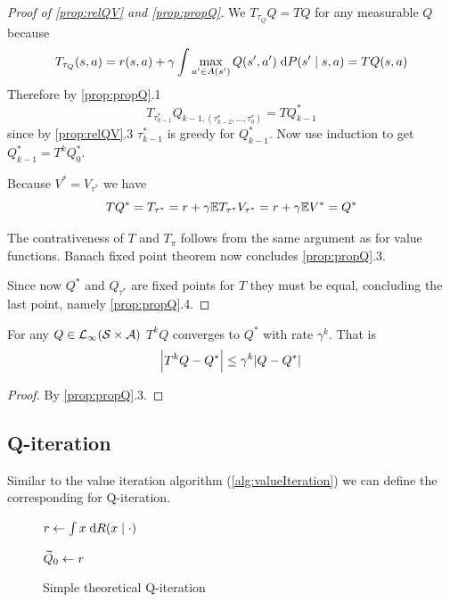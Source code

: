 \begin{proof}[Proof of \cref{prop:relQV} and \cref{prop:propQ}]
    We $T_{\tau_Q} Q = T Q$ for any measurable $Q$ because
  \[ T_{\tau_Q}(s, a) = r(s, a) + \gamma \int \max_{a' \in A(s')} Q(s', a')
  \; \mathrm{d} P(s' \mid s, a) = TQ(s, a) \]
  Therefore by \cref{prop:propQ}.1
  \[ T_{\tau_{k-1}^*} Q_{k-1, (\tau_{k-2}^*, \dots, \tau_0^*)}
  = T Q_{k-1}^* \]
  since by \cref{prop:relQV}.3 $\tau_{k-1}^*$ is greedy for $Q_{k-1}^*$.
  Now use induction to get $Q^*_{k-1} = T^k Q_0^*$.

  Because $V^* = V_{\tau^*}$ we have
  \[ TQ^* = T_{\tau^*} = r + \gamma \mathbb{E} T_{\tau^*} V_{\tau^*}
  = r + \gamma \mathbb{E} V^* = Q^* \]

  The contrativeness of $T$ and $T_\pi$ follows from the same argument as for
  value functions.
  Banach fixed point theorem now concludes \cref{prop:propQ}.3.

  Since now $Q^*$ and $Q_{\tau^*}$ are fixed points for $T$ they must be
  equal, concluding the last point, namely \cref{prop:propQ}.4.
\end{proof}

\begin{cor}
  For any $Q \in \mathcal{L}_\infty(\mathcal{S} \times \mathcal{A})$
  $T^k Q$ converges to $Q^*$ with rate $\gamma^k$.
  That is
  \[ \abs{T^k Q - Q^*} \leq \gamma^k \abs{Q - Q^*} \]
  \label{cor:QrateSimple}
\end{cor}
\begin{proof}
  By \cref{prop:propQ}.3.
\end{proof}

\subsection{Q-iteration}

Similar to the value iteration algorithm (\cref{alg:valueIteration}) we can
define the corresponding for Q-iteration.

\begin{figure}[H]
\begin{algorithm}[H] %
\caption{Simple theoretical Q-iteration}
$r \leftarrow \int x \; \mathrm{d} R(x \mid \cdot)$

$\widetilde{Q}_0 \leftarrow r$

\label{alg:theoSimpleQ}
\end{algorithm}
\end{figure}

